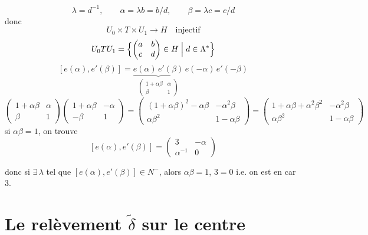 \documentclass[11pt,a4paper]{article}
\begin{document}
\[
\lambda = d^{-1}, \qquad \alpha = \lambda b = b/d, \qquad \beta = \lambda c = c/d
\]
donc
\[
U_0 \times T \times U_1 \longrightarrow H \quad \text{injectif}
\]
\[
U_0 T U_1 = \Bigl\{ \begin{pmatrix} a & b \\ c & d \end{pmatrix} \in H \Bigm| d \in \Lambda^* \Bigr\}
\]
\[
[e(\alpha), e'(\beta)] = \underbrace{e(\alpha)\,e'(\beta)}_{\begin{pmatrix} 1 + \alpha\beta & \alpha \\ \beta & 1 \end{pmatrix}}\, e(-\alpha)\,e'(-\beta)
\]
\[
\begin{pmatrix} 1 + \alpha\beta & \alpha \\ \beta & 1 \end{pmatrix}
\begin{pmatrix} 1 + \alpha\beta & -\alpha \\ -\beta & 1 \end{pmatrix}
= \begin{pmatrix} (1 + \alpha\beta)^2 - \alpha\beta & -\alpha^2\beta \\ \alpha\beta^2 & 1 - \alpha\beta \end{pmatrix}
= \begin{pmatrix} 1 + \alpha\beta + \alpha^2\beta^2 & -\alpha^2\beta \\ \alpha\beta^2 & 1 - \alpha\beta \end{pmatrix}
\]
si $\alpha\beta = 1$, on trouve
\[
[e(\alpha), e'(\beta)] = \begin{pmatrix} 3 & -\alpha \\ \alpha^{-1} & 0 \end{pmatrix}
\]

donc si $\exists\,\lambda$ tel que $[e(\alpha), e'(\beta)] \in N^-$, alors $\alpha\beta = 1$, $3 = 0$ i.e. on est en car $3$.

\section{Le relèvement $\tilde\delta$ sur le centre}
\end{document}
